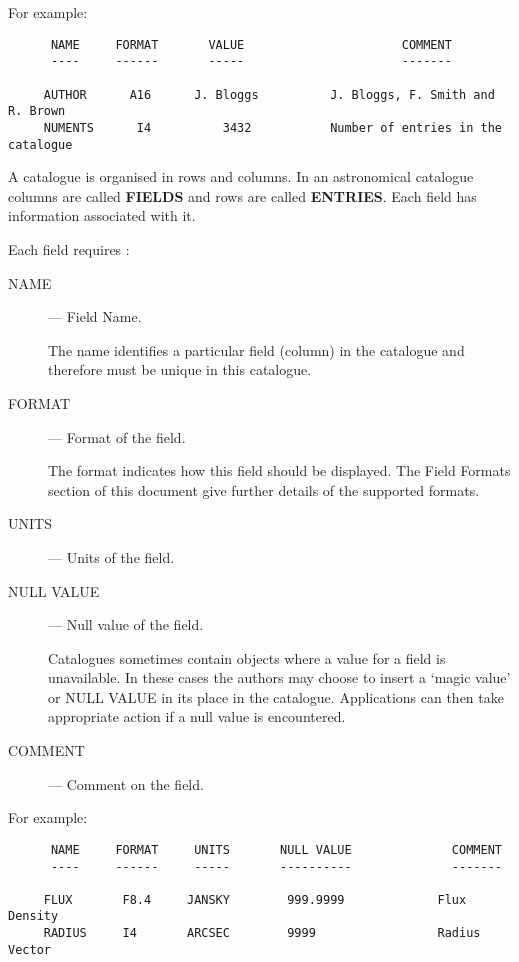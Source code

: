 For example:
\begin{small}
\begin{verbatim}
      NAME     FORMAT       VALUE                      COMMENT
      ----     ------       -----                      -------

     AUTHOR      A16      J. Bloggs          J. Bloggs, F. Smith and R. Brown
     NUMENTS      I4          3432           Number of entries in the catalogue
\end{verbatim}
\end{small}

A catalogue is organised in rows and columns. In an astronomical  catalogue 
columns are called 
{\bf FIELDS} and rows are called {\bf ENTRIES}. Each field has information 
associated with it.

Each field requires :
 
\begin{description}
\begin{description}
\item [NAME] --- Field Name. 

The name identifies a particular field (column) in the 
catalogue and therefore must be unique in this catalogue.

\item [FORMAT] --- Format of the field.

The format indicates how this field should be displayed. The Field Formats
section of this document give further details of the supported formats.

\item [UNITS] --- Units of the field.

\item [NULL VALUE] --- Null value of the field.

Catalogues sometimes contain objects where a value for a  field is unavailable.
In these cases the authors may choose to insert a `magic value' or NULL  VALUE
in its place in the catalogue. Applications can then take appropriate action if
a null value is encountered. 

\item [COMMENT] --- Comment on the field.

\end{description}
\end{description}

For example:

\begin{small}
\begin{verbatim}
      NAME     FORMAT     UNITS       NULL VALUE              COMMENT
      ----     ------     -----       ----------              -------

     FLUX       F8.4     JANSKY        999.9999             Flux Density   
     RADIUS     I4       ARCSEC        9999                 Radius Vector
\end{verbatim}
\end{small}

